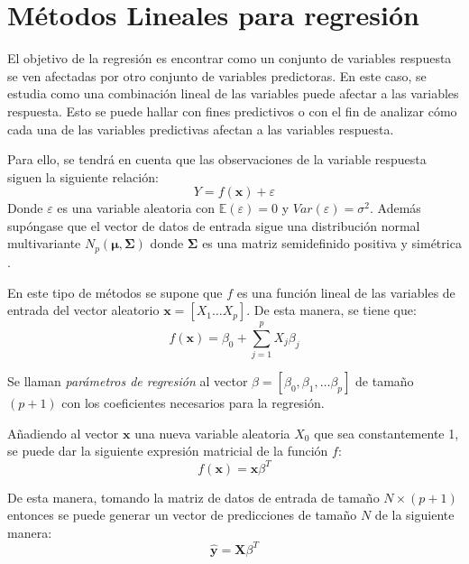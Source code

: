 \section{Métodos Lineales para regresión}

\noindent El objetivo de la regresión es encontrar como un conjunto de variables respuesta se ven afectadas por otro conjunto de variables predictoras. En este caso, se estudia como una combinación lineal de las variables puede afectar a las variables respuesta. Esto se puede hallar con fines predictivos o con el fin de analizar cómo cada una de las variables predictivas afectan a las variables respuesta. 

\noindent Para ello, se tendrá en cuenta que las observaciones de la variable respuesta siguen la siguiente relación:
\begin{equation}
Y=f(\textbf{x})+\varepsilon
\end{equation}
\noindent Donde $\varepsilon$ es una variable aleatoria con $\mathbb{E}(\varepsilon)=0$ y $Var(\varepsilon)=\sigma^2$. Además supóngase que el vector de datos de entrada sigue una distribución normal multivariante $N_p(\mathbf{\mu},\mathbf{\Sigma})$ donde $\mathbf{\Sigma }$ es una matriz semidefinido positiva y simétrica \cite{Chatfield 1989}.


\noindent En este tipo de métodos se supone que $f$ es una función lineal de las variables de entrada del vector aleatorio $\textbf{x}=[X_1\ldots X_p]$. De esta manera, se tiene que:  
\begin{equation}
f(\textbf{x})=\beta_0+\sum_{j=1}^p X_j\beta_j
\end{equation}

\begin{defi}
Se llaman \emph{parámetros de regresión} al vector $\beta=[\beta_0, \beta_1, \ldots \beta_p]$ de tamaño $(p+1)$ con los coeficientes necesarios para la regresión. 
\end{defi} 

\noindent Añadiendo al vector $\mathbf{x}$ una nueva variable aleatoria $X_0$ que sea constantemente 1, se puede dar la siguiente expresión matricial de la función $f$:
\begin{equation}
f(\mathbf{x})= \mathbf{x}\beta^T
\end{equation}

\noindent De esta manera, tomando la matriz de datos de entrada de tamaño $N\times (p+1)$ entonces se puede generar un vector de predicciones de tamaño $N$ de la siguiente manera:
\begin{equation}
\mathbf{\hat{y}}=\mathbf{X}\beta^T  
\end{equation}  

